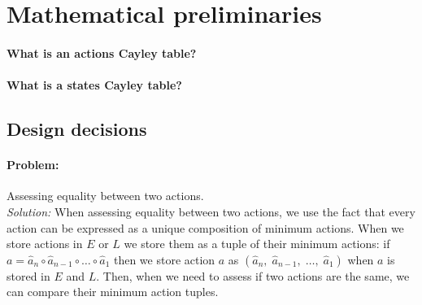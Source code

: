 \section{Mathematical preliminaries}


\paragraph{What is an actions Cayley table?}


\paragraph{What is a states Cayley table?}


\paragraph{}

\subsection{Design decisions}

\paragraph{Problem:}
Assessing equality between two actions.
\\\textit{Solution:}
When assessing equality between two actions, we use the fact that every action can be expressed as a unique composition of minimum actions.
When we store actions in $E$ or $L$ we store them as a tuple of their minimum actions: if $a = \hat{a}_{n} \circ \hat{a}_{n-1} \circ \dots \circ \hat{a}_{1}$ then we store action $a$ as $(\hat{a}_{n}, \; \hat{a}_{n-1}, \; \dots, \; \hat{a}_{1})$ when $a$ is stored in $E$ and $L$.
Then, when we need to assess if two actions are the same, we can compare their minimum action tuples. 

